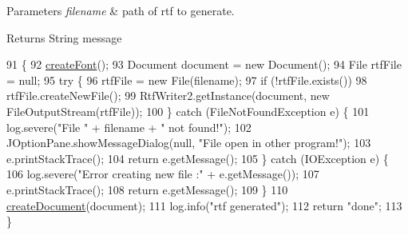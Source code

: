 \begin{DoxyParams}{Parameters}
{\em filename} & path of rtf to generate. \\
\hline
\end{DoxyParams}
\begin{DoxyReturn}{Returns}
String message 
\end{DoxyReturn}

\begin{DoxyCode}
91                                              \{
92         \hyperlink{classit_1_1isislab_1_1masonassisteddocumentation_1_1mason_1_1control_1_1_pdf_rtf_generator_af1f9a21f995c47a9e1a5a6f276c97852}{createFont}();
93         Document document = \textcolor{keyword}{new} Document();
94         File rtfFile = null;
95         \textcolor{keywordflow}{try} \{
96             rtfFile = \textcolor{keyword}{new} File(filename);
97             \textcolor{keywordflow}{if} (!rtfFile.exists())
98                 rtfFile.createNewFile();
99             RtfWriter2.getInstance(document, \textcolor{keyword}{new} FileOutputStream(rtfFile));
100         \} \textcolor{keywordflow}{catch} (FileNotFoundException e) \{
101             log.severe(\textcolor{stringliteral}{"File "} + filename + \textcolor{stringliteral}{" not found!"});
102             JOptionPane.showMessageDialog(null, \textcolor{stringliteral}{"File open in other program!"});
103             e.printStackTrace();
104             \textcolor{keywordflow}{return} e.getMessage();
105         \} \textcolor{keywordflow}{catch} (IOException e) \{
106             log.severe(\textcolor{stringliteral}{"Error creating new file :"} + e.getMessage());
107             e.printStackTrace();
108             \textcolor{keywordflow}{return} e.getMessage();
109         \}
110         \hyperlink{classit_1_1isislab_1_1masonassisteddocumentation_1_1mason_1_1control_1_1_pdf_rtf_generator_add23c0e308cdf54a3c1e3a8128ea29ed}{createDocument}(document);
111         log.info(\textcolor{stringliteral}{"rtf generated"});
112         \textcolor{keywordflow}{return} \textcolor{stringliteral}{"done"};
113     \}
\end{DoxyCode}


